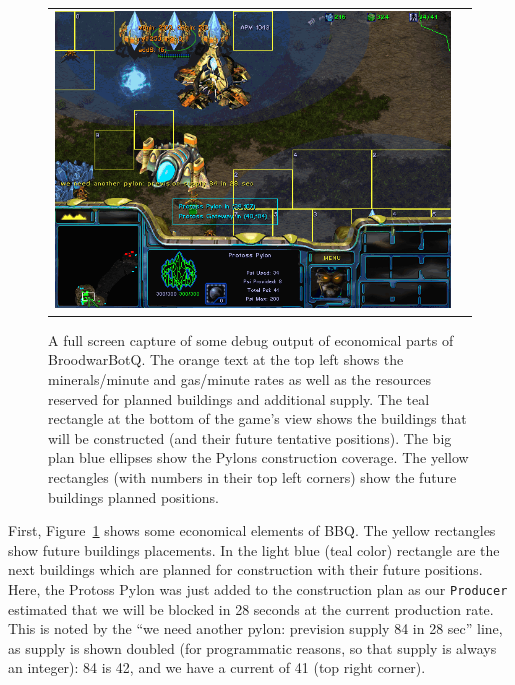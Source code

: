 \begin{figure}[h]
\begin{center}
\begin{tabular}{cc}
\includegraphics[width=0.90\columnwidth]{images/botgame/macro0.png}
\end{tabular}
\caption{A full screen capture of some debug output of economical parts of BroodwarBotQ. The orange text at the top left shows the minerals/minute and gas/minute rates as well as the resources reserved for planned buildings and additional supply. The teal rectangle at the bottom of the game's view shows the buildings that will be constructed (and their future tentative positions). The big plan blue ellipses show the Pylons construction coverage. The yellow rectangles (with numbers in their top left corners) show the future buildings planned positions.}
\label{fig:bot_macro}
\end{center}
\end{figure}

First, Figure~\ref{fig:bot_macro} shows some economical elements of BBQ. The yellow rectangles show future buildings placements. In the light blue (teal color) rectangle are the next buildings which are planned for construction with their future positions. Here, the Protoss Pylon was just added to the construction plan as our \texttt{Producer} estimated that we will be  blocked in 28 seconds at the current production rate. This is noted by the ``we need another pylon: prevision supply 84 in 28 sec'' line, as supply is shown doubled (for programmatic reasons, so that supply is always an integer): 84 is 42, and we have a current  of 41 (top right corner). 

